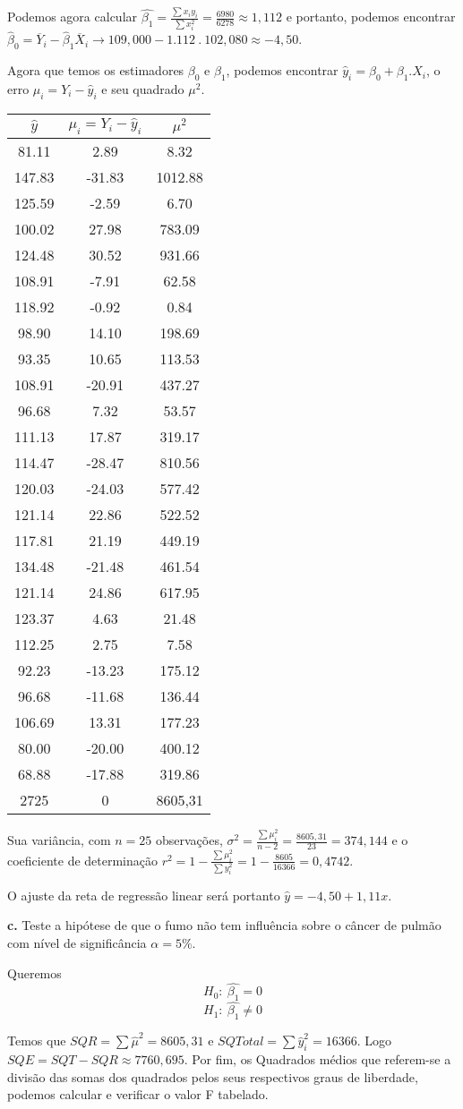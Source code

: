 \documentclass[
  openany]{book}
\begin{document}
Podemos agora calcular \(\hat{\beta_1}=\frac{\sum x_i y_i}{\sum x_i^2}=\frac{6980}{6278}\approx 1,112\) e portanto, podemos encontrar \(\hat{\beta}_0=\overline{Y}_i-\hat{\beta}_1\overline{X}_i \rightarrow 109,000-1.112 \ . \ 102,080\approx -4,50\).

Agora que temos os estimadores \(\beta_0\) e \(\beta_1\), podemos encontrar \(\hat{y}_i=\beta_0+\beta_1 . X_i\), o erro \(\mu_i=Y_i-\hat{y}_i\) e seu quadrado \(\mu^2\).

\begin{longtable}[]{@{}ccc@{}}
\toprule
\(\hat{y}\) & \(\mu_i=Y_i-\hat{y}_i\) & \(\mu^2\)\tabularnewline
\midrule
\endhead
81.11 & 2.89 & 8.32\tabularnewline
147.83 & -31.83 & 1012.88\tabularnewline
125.59 & -2.59 & 6.70\tabularnewline
100.02 & 27.98 & 783.09\tabularnewline
124.48 & 30.52 & 931.66\tabularnewline
108.91 & -7.91 & 62.58\tabularnewline
118.92 & -0.92 & 0.84\tabularnewline
98.90 & 14.10 & 198.69\tabularnewline
93.35 & 10.65 & 113.53\tabularnewline
108.91 & -20.91 & 437.27\tabularnewline
96.68 & 7.32 & 53.57\tabularnewline
111.13 & 17.87 & 319.17\tabularnewline
114.47 & -28.47 & 810.56\tabularnewline
120.03 & -24.03 & 577.42\tabularnewline
121.14 & 22.86 & 522.52\tabularnewline
117.81 & 21.19 & 449.19\tabularnewline
134.48 & -21.48 & 461.54\tabularnewline
121.14 & 24.86 & 617.95\tabularnewline
123.37 & 4.63 & 21.48\tabularnewline
112.25 & 2.75 & 7.58\tabularnewline
92.23 & -13.23 & 175.12\tabularnewline
96.68 & -11.68 & 136.44\tabularnewline
106.69 & 13.31 & 177.23\tabularnewline
80.00 & -20.00 & 400.12\tabularnewline
68.88 & -17.88 & 319.86\tabularnewline
2725 & 0 & 8605,31\tabularnewline
\bottomrule
\end{longtable}

Sua variância, com \(n=25\) observações, \(\sigma^2=\frac{\sum \mu_i^2}{n-2}=\frac{8605,31}{23}=374,144\) e o coeficiente de determinação \(r^2=1-\frac{\sum \mu^2_i}{\sum y^2_i}=1-\frac{8605}{16366}=0,4742\).

O ajuste da reta de regressão linear será portanto \(\hat{y}=-4,50+1,11x\).

\textbf{c.} Teste a hipótese de que o fumo não tem influência sobre o câncer de pulmão com nível de significância \(\alpha=5\%\).

Queremos
\[H_0: \ \hat{\beta_1}=0\]
\[H_1: \ \hat{\beta_1}\neq 0\]

Temos que \(SQR = \sum \hat{\mu}^2 = 8605,31\) e \(SQ Total = \sum \hat{y}^2_i=16366\). Logo \(SQE = SQT - SQR \approx 7760,695.\) Por fim, os Quadrados médios que referem-se a divisão das somas dos quadrados pelos seus respectivos graus de liberdade, podemos calcular e verificar o valor F tabelado.
\end{document}
